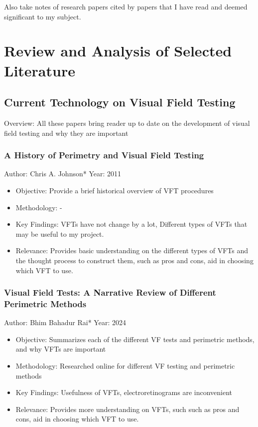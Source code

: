 \documentclass[11pt]{article}
\begin{document}
    Also take notes of research papers cited by papers that I have read and deemed significant to my subject.

\newpage
\section{Review and Analysis of Selected Literature}
\subsection{Current Technology on Visual Field Testing}
    Overview: All these papers bring reader up to date on the development of visual field testing and why they are important
        \subsubsection{A History of Perimetry and Visual Field Testing}
            Author: Chris A. Johnson*
            Year: 2011
            \begin{itemize}
                \item Objective:  Provide a brief historical overview of VFT procedures
                \item Methodology: -
                \item Key Findings: VFTs have not change by a lot, Different types of VFTs that may be useful to my project.
                \item Relevance:  Provides basic understanding on the different types of VFTs and the thought process to construct them, such as pros and cons, aid in choosing which VFT to use.
            \end{itemize}

        \subsubsection{Visual Field Tests: A Narrative Review of Different                  Perimetric Methods}
            Author: Bhim Bahadur Rai*
            Year: 2024
            \begin{itemize}
                \item Objective: Summarizes each of the different VF tests and perimetric methods, and why VFTs are important
                \item Methodology: Researched online for different VF testing and perimetric methods
                \item Key Findings: Usefulness of VFTs, electroretinograms are inconvenient
                \item Relevance: Provides more understanding on VFTs, such such as pros and cons, aid in choosing which VFT to use.
            \end{itemize}
\end{document}
